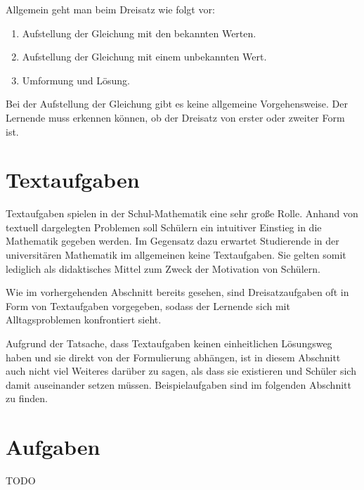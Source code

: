 Allgemein geht man beim Dreisatz wie folgt vor:
\begin{enumerate}
\item Aufstellung der Gleichung mit den bekannten Werten.
\item Aufstellung der Gleichung mit einem unbekannten Wert.
\item Umformung und Lösung.
\end{enumerate}
Bei der Aufstellung der Gleichung gibt es keine allgemeine Vorgehensweise. Der Lernende muss erkennen können, ob der Dreisatz von erster oder zweiter Form ist. 

\section{Textaufgaben}

Textaufgaben spielen in der Schul-Mathematik eine sehr große Rolle. Anhand von textuell dargelegten Problemen soll Schülern ein intuitiver Einstieg in die Mathematik gegeben werden. Im Gegensatz dazu erwartet Studierende in der universitären Mathematik im allgemeinen keine Textaufgaben. Sie gelten somit lediglich als didaktisches Mittel zum Zweck der Motivation von Schülern. 

Wie im vorhergehenden Abschnitt bereits gesehen, sind Dreisatzaufgaben oft in Form von Textaufgaben vorgegeben, sodass der Lernende sich mit Alltagsproblemen konfrontiert sieht. 

Aufgrund der Tatsache, dass Textaufgaben keinen einheitlichen Lösungsweg haben und sie direkt von der Formulierung abhängen, ist in diesem Abschnitt auch nicht viel Weiteres darüber zu sagen, als dass sie existieren und Schüler sich damit auseinander setzen müssen. Beispielaufgaben sind im folgenden Abschnitt zu finden.

\section{Aufgaben}

TODO